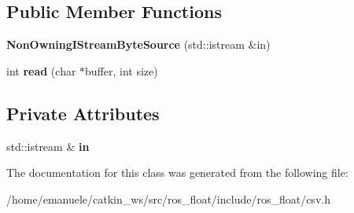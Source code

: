 \subsection*{Public Member Functions}
\begin{DoxyCompactItemize}
\item 
\mbox{\label{classio_1_1detail_1_1NonOwningIStreamByteSource_aacb55ba2f52ba1c30810697d6aa92169}} 
{\bfseries Non\+Owning\+I\+Stream\+Byte\+Source} (std\+::istream \&in)
\item 
\mbox{\label{classio_1_1detail_1_1NonOwningIStreamByteSource_ac7b1968c8314896d7ec0ebb97fdda30d}} 
int {\bfseries read} (char $\ast$buffer, int size)
\end{DoxyCompactItemize}
\subsection*{Private Attributes}
\begin{DoxyCompactItemize}
\item 
\mbox{\label{classio_1_1detail_1_1NonOwningIStreamByteSource_a42ec07be9409b77a17bdf08cfa73739d}} 
std\+::istream \& {\bfseries in}
\end{DoxyCompactItemize}


The documentation for this class was generated from the following file\+:\begin{DoxyCompactItemize}
\item 
/home/emanuele/catkin\+\_\+ws/src/ros\+\_\+float/include/ros\+\_\+float/csv.\+h\end{DoxyCompactItemize}
